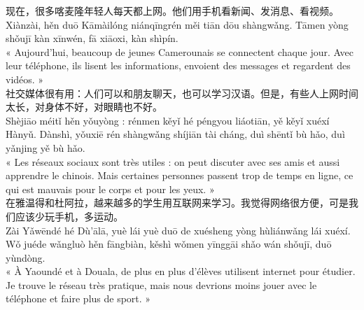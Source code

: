 \documentclass[11pt]{article}
\begin{document}
\begin{textebox}
现在，很多喀麦隆年轻人每天都上网。他们用手机看新闻、发消息、看视频。\\
Xiànzài, hěn duō Kāmàilóng niánqīngrén měi tiān dōu shàngwǎng. Tāmen yòng shǒujī kàn xīnwén, fā xiāoxi, kàn shìpín.\\
« Aujourd'hui, beaucoup de jeunes Camerounais se connectent chaque jour. Avec leur téléphone, ils lisent les informations, envoient des messages et regardent des vidéos. »\\[4pt]
社交媒体很有用：人们可以和朋友聊天，也可以学习汉语。但是，有些人上网时间太长，对身体不好，对眼睛也不好。\\
Shèjiāo méitǐ hěn yǒuyòng : rénmen kěyǐ hé péngyou liáotiān, yě kěyǐ xuéxí Hànyǔ. Dànshì, yǒuxiē rén shàngwǎng shíjiān tài cháng, duì shēntǐ bù hǎo, duì yǎnjing yě bù hǎo.\\
« Les réseaux sociaux sont très utiles : on peut discuter avec ses amis et aussi apprendre le chinois. Mais certaines personnes passent trop de temps en ligne, ce qui est mauvais pour le corps et pour les yeux. »\\[4pt]
在雅温得和杜阿拉，越来越多的学生用互联网来学习。我觉得网络很方便，可是我们应该少玩手机，多运动。\\
Zài Yǎwēndé hé Dù'ālā, yuè lái yuè duō de xuésheng yòng hùliánwǎng lái xuéxí. Wǒ juéde wǎngluò hěn fāngbiàn, kěshì wǒmen yīnggāi shǎo wán shǒujī, duō yùndòng.\\
« À Yaoundé et à Douala, de plus en plus d'élèves utilisent internet pour étudier. Je trouve le réseau très pratique, mais nous devrions moins jouer avec le téléphone et faire plus de sport. »
\end{textebox}
\end{document}
